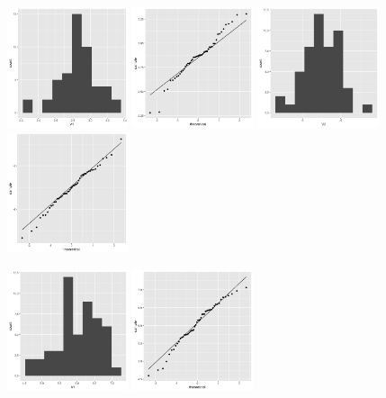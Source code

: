 \begin{enumerate}
\begin{center}
	\includegraphics[width=1.4in]{II_1_V1_hist.png}
	\includegraphics[width=1.4in]{II_1_V1_qq.png}
	\includegraphics[width=1.4in]{II_1_V2_hist.png}
	\includegraphics[width=1.4in]{II_1_V2_qq.png}
\end{center}
\begin{center}
	\includegraphics[width=1.4in]{II_2_V1_hist.png}
	\includegraphics[width=1.4in]{II_2_V1_qq.png}

\end{center}
\end{enumerate}
